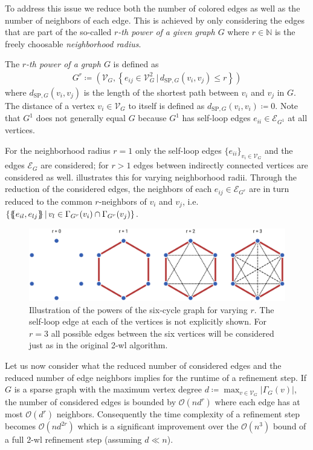 \begin{enumerate}[label=\textbf{\arabic*.}]
		To address this issue we reduce both the number of colored edges as well as the number of neighbors of each edge.
		This is achieved by only considering the edges that are part of the so-called \textit{$r$-th power of a given graph $G$} where $r \in \mathbb{N}$ is the freely choosable \textit{neighborhood radius}.
		\begin{defn}
			The \textit{$r$-th power of a graph $G$} is defined as
			\begin{align*}
				G^r \coloneqq \left(\mathcal{V}_G, \left\{ e_{ij} \in \mathcal{V}_G^2\, |\, d_{\mathrm{SP}, G}(v_i, v_j) \leq r \right\}\right) %
			\end{align*}
			where $d_{\mathrm{SP}, G}(v_i, v_j)$ is the length of the shortest path between $v_i$ and $v_j$ in $G$.
			The distance of a vertex $v_i \in \mathcal{V}_G$ to itself is defined as $d_{\mathrm{SP}, G}(v_i, v_i) \coloneqq 0$.
			Note that $G^1$ does not generally equal $G$ because $G^1$ has self-loop edges $e_{ii} \in \mathcal{E}_{G^1}$ at all vertices.
		\end{defn}
		For the neighborhood radius $r = 1$ only the self-loop edges ${\{ e_{ii} \}}_{v_i \in \mathcal{V}_G}$ and the edges $\mathcal{E}_{G}$ are considered;
		for $r > 1$ edges between indirectly connected vertices are considered as well.
		 illustrates this for varying neighborhood radii.
		Through the reduction of the considered edges, the neighbors of each $e_{ij} \in \mathcal{E}_{G^r}$ are in turn reduced to the common $r$-neighbors of $v_i$ and $v_j$, i.e.\ $\{ \ldblbrace e_{il}, e_{lj} \rdblbrace\, |\, v_l \in {\Gamma_{G^r}(v_i) \cap \Gamma_{G^r}(v_j)} \}$. %
		\begin{figure}[t]
			\centering
			\includegraphics[width=0.9\linewidth]{gfx/ltd/neighborhood-radius.pdf}
			\caption{
				Illustration of the powers of the six-cycle graph for varying $r$.
				The self-loop edge at each of the vertices is not explicitly shown.
				For $r = 3$ all possible edges between the six vertices will be considered just as in the original 2-\acs{wl} algorithm.
			}\label{fig:ltd:neighborhood-radius}
		\end{figure}

		Let us now consider what the reduced number of considered edges and the reduced number of edge neighbors implies for the runtime of a refinement step.
		If $G$ is a sparse graph with the maximum vertex degree $d \coloneqq \max_{v \in \mathcal{V}_G} \left|\Gamma_G(v)\right|$, the number of considered edges is bounded by $\mathcal{O}(n d^r)$ where each edge has at most $\mathcal{O}(d^r)$ neighbors.
		Consequently the time complexity of a refinement step becomes $\mathcal{O}(n d^{2r})$ which is a significant improvement over the $\mathcal{O}(n^3)$ bound of a full 2-\acs{wl} refinement step (assuming $d \ll n$).
\end{enumerate}
